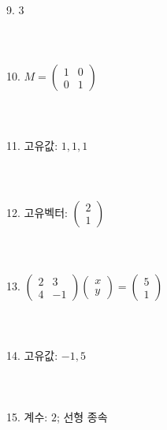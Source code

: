 \documentclass[fleqn]{article}
\begin{document}
9. \( 3 \) \\\\\\\\
10. \( M = \begin{pmatrix} 1 & 0 \\ 0 & 1 \end{pmatrix} \) \\\\\\\\
11. 고유값: \( 1, 1, 1 \) \\\\\\\\
12. 고유벡터: \( \begin{pmatrix} 2 \\ 1 \end{pmatrix} \) \\\\\\\\
13. \( \begin{pmatrix} 2 & 3 \\ 4 & -1 \end{pmatrix} \begin{pmatrix} x \\ y \end{pmatrix} = \begin{pmatrix} 5 \\ 1 \end{pmatrix} \) \\\\\\\\
14. 고유값: \( -1, 5 \) \\\\\\\\
15. 계수: \( 2 \); 선형 종속 \\\\\\\\      
        
\end{document}
